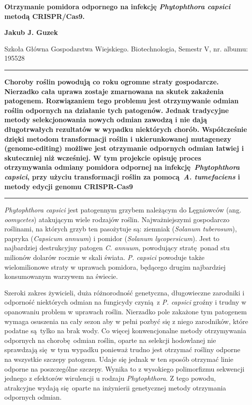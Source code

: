 \documentclass[two column, twoside, a4paper]{article}
\begin{document}
\begin{strip}
	{\sc \bfseries \LARGE {}\selectfont Otrzymanie pomidora odpornego na infekcję \textit{Phytophthora capsici} metodą CRISPR/Cas9.} \vspace{\baselineskip}

{\bfseries \large Jakub J. Guzek}

{Szkoła Główna Gospodarstwa Wiejskiego. Biotechnologia, Semestr V, nr. albumu: 195528}\vspace{\baselineskip}

\hrule\vspace{\baselineskip}

	\textbf{\textsf{Choroby roślin powodują co roku ogromne straty gospodarcze. Nierzadko cała uprawa zostaje zmarnowana na skutek zakażenia patogenem. Rozwiązaniem tego problemu jest otrzymywanie odmian roślin odpornych na działanie tych patogenów. Jednak tradycyjne metody selekcjonowania nowych odmian zawodzą i nie dają długotrwałych rezultatów w wypadku niektórych chorób. Współcześnie dzięki metodom transformacji roślin i ukierunkowanej mutagenezy (genome-editing) możliwe jest otrzymanie odpornych odmian łatwiej i skuteczniej niż wcześniej. W tym projekcie opisuję proces otrzymywania odmiany pomidora odpornej na infekcję \textit{Phytophthora capsici}, przy użyciu transformacji roślin za pomocą \textit{A. tumefaciens} i metody edycji genomu CRISPR-Cas9}}\vspace{\baselineskip}

\hrule

\end{strip}

\textit{Phytophthora capsici} jest patogennym grzybem należącym do Lęgniowców (ang. \textit{oomycetes}) atakującym wiele rodzajów roślin. Najważniejszymi gospodarczo roślinami, na których grzyb ten pasożytuje są: ziemniak (\textit{Solanum tuberosum}), papryka (\textit{Capsicum annuum}) i pomidor (\textit{Solanum lycopersicum})\autocite{Lamour2012}. Jest to najbardziej destrukcyjny patogen \textit{C. annuum}, powodujący stratę ponad stu milionów dolarów rocznie w skali świata\autocite{Barchenger2018}. \textit{P. capsici} powoduje także wielomilionowe straty w uprawach pomidora, będącego drugim najbardziej konsumowanym warzywem na świecie.

Szeroki zakres żywicieli, duża różnorodność genetyczna, długowieczne zarodniki i odporność niektórych odmian na fungicydy czynią z \textit{P. capsici} groźny i trudny w opanowaniu problem w uprawach roślin. Nierzadko pole zakażone tym patogenem wymaga osuszenia na cały sezon aby w pełni pozbyć się z niego zarodników, które podatne są tylko na brak wody\autocite{Lamour2012}. Co więcej konwencjonalne metody otrzymywania odpornych na chorobę odmian roślin, oparte na selekcji hodowlanej nie sprawdzają się w tym wypadku ponieważ trudno jest otrzymać rośliny odporne na wszystkie szczepy patogenu. Udaje się jednak w ten sposób otrzymać linie odporne na poszczególne szczepy\autocite{Sy2005}. Wynika to z wysokiego polimorfizmu sekwencji jednego z efektorów wirulencji u rodzaju \textit{Phytophthora}\autocite{Chen2019}. Z tego powodu, atrakcyjne wydają się oparte na inżynierii genetycznej metody otrzymania odpornych odmian.
\end{document}
